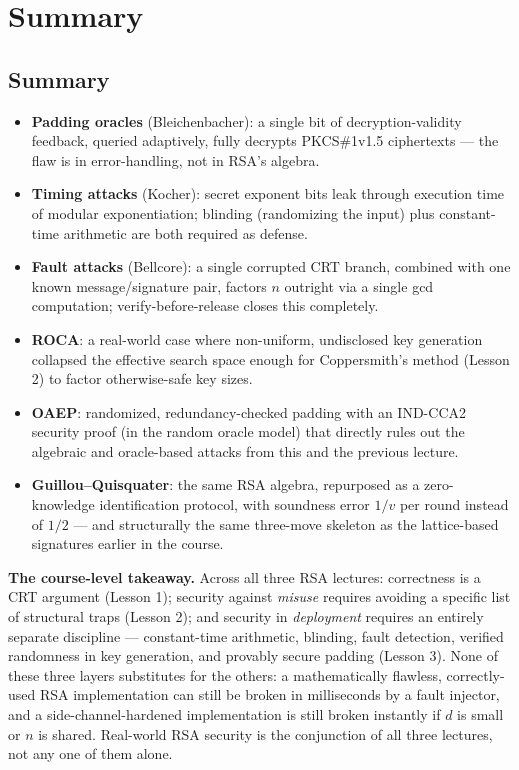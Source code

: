 \newpage
\section{Summary}

\subsection*{Summary}
\begin{itemize}
\item \textbf{Padding oracles} (Bleichenbacher): a single bit of decryption-validity feedback, queried adaptively, fully decrypts PKCS\#1v1.5 ciphertexts — the flaw is in error-handling, not in RSA's algebra.
\item \textbf{Timing attacks} (Kocher): secret exponent bits leak through execution time of modular exponentiation; blinding (randomizing the input) plus constant-time arithmetic are both required as defense.
\item \textbf{Fault attacks} (Bellcore): a single corrupted CRT branch, combined with one known message/signature pair, factors $n$ outright via a single gcd computation; verify-before-release closes this completely.
\item \textbf{ROCA}: a real-world case where non-uniform, undisclosed key generation collapsed the effective search space enough for Coppersmith's method (Lesson 2) to factor otherwise-safe key sizes.
\item \textbf{OAEP}: randomized, redundancy-checked padding with an IND-CCA2 security proof (in the random oracle model) that directly rules out the algebraic and oracle-based attacks from this and the previous lecture.
\item \textbf{Guillou--Quisquater}: the same RSA algebra, repurposed as a zero-knowledge identification protocol, with soundness error $1/v$ per round instead of $1/2$ — and structurally the same three-move skeleton as the lattice-based signatures earlier in the course.
\end{itemize}

\medskip\noindent\textbf{The course-level takeaway.} Across all three RSA lectures: correctness is a CRT argument (Lesson 1); security against \emph{misuse} requires avoiding a specific list of structural traps (Lesson 2); and security in \emph{deployment} requires an entirely separate discipline — constant-time arithmetic, blinding, fault detection, verified randomness in key generation, and provably secure padding (Lesson 3). None of these three layers substitutes for the others: a mathematically flawless, correctly-used RSA implementation can still be broken in milliseconds by a fault injector, and a side-channel-hardened implementation is still broken instantly if $d$ is small or $n$ is shared. Real-world RSA security is the conjunction of all three lectures, not any one of them alone.

